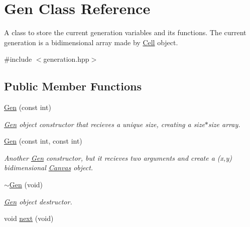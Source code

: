 \hypertarget{class_gen}{}\section{Gen Class Reference}
\label{class_gen}


A class to store the current generation variables and it\textquotesingle{}s functions. The current generation is a bidimensional array made by \mbox{\hyperlink{class_cell}{Cell}} object.  




{\ttfamily \#include $<$generation.\+hpp$>$}

\subsection*{Public Member Functions}
\begin{DoxyCompactItemize}
\item 
\mbox{\label{class_gen_acdae00bbb102fcf0a6f992c63844bd97}} 
\mbox{\hyperlink{class_gen_acdae00bbb102fcf0a6f992c63844bd97}{Gen}} (const int)
\begin{DoxyCompactList}\small\item\em \mbox{\hyperlink{class_gen}{Gen}} object constructor that recieves a unique size, creating a size$\ast$size array. \end{DoxyCompactList}\item 
\mbox{\hyperlink{class_gen_a4f0a5bc8aef4821c976a850f3f94307b}{Gen}} (const int, const int)
\begin{DoxyCompactList}\small\item\em Another \mbox{\hyperlink{class_gen}{Gen}} constructor, but it recieves two arguments and create a (x,y) bidimensional \mbox{\hyperlink{class_canvas}{Canvas}} object. \end{DoxyCompactList}\item 
\mbox{\label{class_gen_a6c42c5841cba31931c06406eddf14fc1}} 
\mbox{\hyperlink{class_gen_a6c42c5841cba31931c06406eddf14fc1}{$\sim$\+Gen}} (void)
\begin{DoxyCompactList}\small\item\em \mbox{\hyperlink{class_gen}{Gen}} object destructor. \end{DoxyCompactList}\item 
\mbox{\label{class_gen_a98cf94512490100bc8fd5e68b4ebc4db}} 
void \mbox{\hyperlink{class_gen_a98cf94512490100bc8fd5e68b4ebc4db}{next}} (void)

\end{DoxyCompactItemize}
